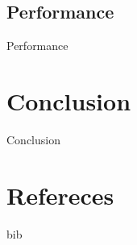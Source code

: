 \documentclass[10pt]{beamer}
\begin{document}
\subsection{Performance}
\begin{frame}{Performance}
    
\end{frame}

\section{Conclusion}
\begin{frame}{Conclusion}
    
\end{frame}

\section{Refereces}
\begin{frame}{bib}
    
\end{frame}
\end{document}
